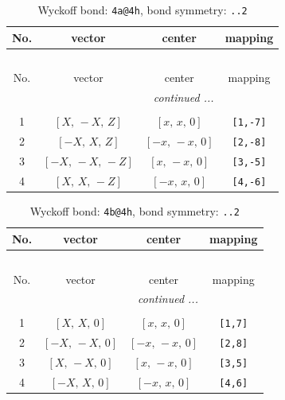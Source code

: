 \documentclass[fleqn,8pt]{jsarticle}
\begin{document}
\begin{longtable}{cccc}
\caption{Wyckoff bond: {\tt 4a@4h}, bond symmetry: {\tt ..2}}
 \\
 \hline \hline
No. & vector & center & mapping \\ \hline \endfirsthead

\multicolumn{3}{l}{\tablename\ \thetable{}} \\
 \hline \hline
No. & vector & center & mapping \\ \hline \endhead

 \hline \hline
\multicolumn{3}{r}{\footnotesize\it continued ...} \\ \endfoot

 \hline \hline
\multicolumn{3}{r}{} \\ \endlastfoot

1 & $\left[ X,\, - X,\, Z \right]$ & $\left[ x,\, x,\, 0 \right]$ & {\tt [1,-7]} \\ \hline
2 & $\left[ - X,\, X,\, Z \right]$ & $\left[ - x,\, - x,\, 0 \right]$ & {\tt [2,-8]} \\ \hline
3 & $\left[ - X,\, - X,\, - Z \right]$ & $\left[ x,\, - x,\, 0 \right]$ & {\tt [3,-5]} \\ \hline
4 & $\left[ X,\, X,\, - Z \right]$ & $\left[ - x,\, x,\, 0 \right]$ & {\tt [4,-6]} \\
\end{longtable}
\renewcommand{\arraystretch}{1.2}
\begin{longtable}{cccc}
\caption{Wyckoff bond: {\tt 4b@4h}, bond symmetry: {\tt ..2}}
 \\
 \hline \hline
No. & vector & center & mapping \\ \hline \endfirsthead

\multicolumn{3}{l}{\tablename\ \thetable{}} \\
 \hline \hline
No. & vector & center & mapping \\ \hline \endhead

 \hline \hline
\multicolumn{3}{r}{\footnotesize\it continued ...} \\ \endfoot

 \hline \hline
\multicolumn{3}{r}{} \\ \endlastfoot

1 & $\left[ X,\, X,\, 0 \right]$ & $\left[ x,\, x,\, 0 \right]$ & {\tt [1,7]} \\ \hline
2 & $\left[ - X,\, - X,\, 0 \right]$ & $\left[ - x,\, - x,\, 0 \right]$ & {\tt [2,8]} \\ \hline
3 & $\left[ X,\, - X,\, 0 \right]$ & $\left[ x,\, - x,\, 0 \right]$ & {\tt [3,5]} \\ \hline
4 & $\left[ - X,\, X,\, 0 \right]$ & $\left[ - x,\, x,\, 0 \right]$ & {\tt [4,6]} \\
\end{longtable}
\end{document}
